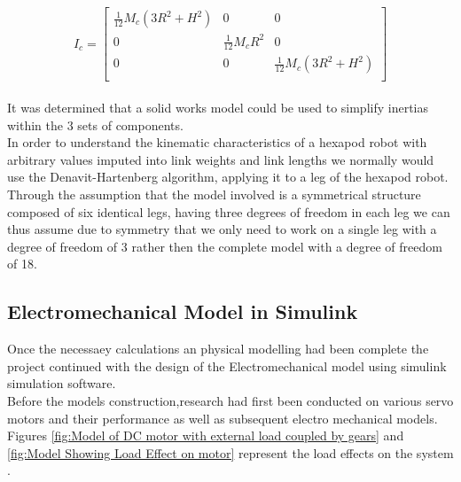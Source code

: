 \begin{equation*}
I_c = 
\begin{bmatrix}
\frac{1}{12} M_c (3R^2+H^2) & 0 & 0\\
0 & \frac{1}{12} M_c R^2 & 0\\
0 & 0 & \frac{1}{12} M_c (3R^2+H^2)\\

\end{bmatrix}
\end{equation*}\\

It was determined that a solid works model could be used to simplify inertias within the 3 sets of components.\\

In order to understand the kinematic characteristics of a hexapod robot with arbitrary values imputed into link weights and link lengths we normally would use the Denavit-Hartenberg algorithm, applying it to a leg of the hexapod robot. Through the assumption that the model involved is a symmetrical structure composed of six identical legs, having three degrees of freedom in each leg we can thus assume due to symmetry that we only need to work on a single leg with a degree of freedom of 3 rather then the complete model with a degree of freedom of 18.


\subsection{Electromechanical Model in Simulink}
Once the necessaey calculations an physical modelling had been complete the project continued with the design of the Electromechanical model using simulink simulation software.\\

Before the models construction,research had first been conducted on various servo motors and their performance as well as subsequent electro mechanical models. Figures \ref{fig:Model of DC motor with external load coupled by gears} and \ref{fig:Model Showing Load Effect on motor} represent the load effects on the system .\\

